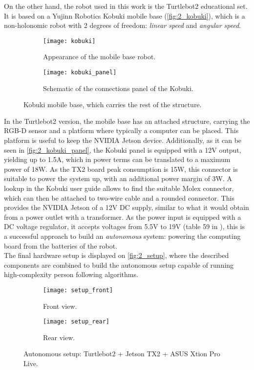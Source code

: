 On the other hand, the robot used in this work is the Turtlebot2 educational set. It is based on a Yujinn Robotics Kobuki mobile base (\autoref{fig:2_kobuki}), which is a non-holonomic robot with 2 degrees of freedom: \textit{linear speed} and \textit{angular speed}.\\
\begin{figure}[h]
	\centering
	\begin{subfigure}[h]{0.4\linewidth}
		\centering
		\texttt{[image: kobuki]}
		\caption{Appearance of the mobile base robot.}
		\label{fig:2_kobuki_appearance}
	\end{subfigure}
\begin{subfigure}[h]{0.5\linewidth}
	\centering
	\texttt{[image: kobuki\_panel]}
	\caption{Schematic of the connections panel of the Kobuki.}
	\label{fig:2_kobuki_panel}
\end{subfigure}
\caption{Kobuki mobile base, which carries the rest of the structure.}
\label{fig:2_kobuki}
\end{figure}

In the Turtlebot2 version, the mobile base has an attached structure, carrying the RGB-D sensor and a platform where typically a computer can be placed. This platform is useful to keep the NVIDIA Jetson device. Additionally, as it can be seen in \autoref{fig:2_kobuki_panel}, the Kobuki panel is equipped with a 12V output, yielding up to 1.5A, which in power terms can be translated to a maximum power of 18W. As the TX2 board peak consumption is 15W, this connector is suitable to power the system up, with an additional power margin of 3W. A lookup in the Kobuki user guide \cite{kobuki_manual} allows to find the suitable Molex connector, which can then be attached to two-wire cable and a rounded connector. This provides the NVIDIA Jetson of a 12V DC supply, similar to what it would obtain from a power outlet with a transformer. As the power input is equipped with a DC voltage regulator, it accepts voltages from 5.5V to 19V (table 59 in \cite{tx2_manual}), this is a successful approach to build an \textit{autonomous} system: powering the computing board from the batteries of the robot.\\

The final hardware setup is displayed on \autoref{fig:2_setup}, where the described components are combined to build the autonomous setup capable of running high-complexity person following algorithms.\\

\begin{figure}[h]
	\centering
	\begin{subfigure}[h]{0.45\linewidth}
		\centering
		\texttt{[image: setup\_front]}
		\caption{Front view.}
	\end{subfigure}
	\begin{subfigure}[h]{0.45\linewidth}
		\centering
		\texttt{[image: setup\_rear]}
		\caption{Rear view.}
	\end{subfigure}
	\caption{Autonomous setup: Turtlebot2 + Jetson TX2 + ASUS Xtion Pro Live.}
	\label{fig:2_setup}
\end{figure}


